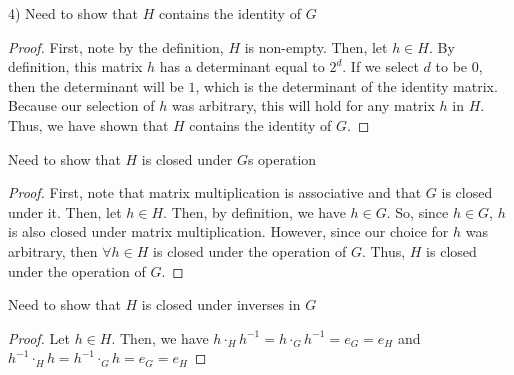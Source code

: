 \documentclass[executivepaper]{article}
\begin{document}
\pagebreak

\vspace*{-40mm}

\begin{flushleft}

4) Need to show that $H$ contains the identity of $G$

\begin{center}

\begin{proof}

First, note by the definition, $H$ is non-empty. Then, let $h \in H$. By definition, this matrix $h$ has a determinant equal to $2^d$. If we select $d$ to be $0$, then the determinant will be $1$, which is the determinant of the identity matrix. Because our selection of $h$ was arbitrary, this will hold for any matrix $h$ in $H$. Thus, we have shown that $H$ contains the identity of $G$.

\end{proof}

\end{center}

Need to show that $H$ is closed under $G$\textsc{}s operation

\begin{center}

\begin{proof}

First, note that matrix multiplication is associative and that $G$ is closed under it. Then, let $h \in H$. Then, by definition, we have $h \in G$. So, since $h \in G$, $h$ is also closed under matrix multiplication. However, since our choice for $h$ was arbitrary, then $\forall h \in H$ is closed under the operation of $G$. Thus, $H$ is closed under the operation of $G$.

\end{proof}

\end{center}

Need to show that $H$ is closed under inverses in $G$

\begin{center}

\begin{proof}

Let $h \in H$. Then, we have $h \cdot_{H} h^{-1}=h \cdot_{G} h^{-1}=e_{G}=e_{H}$ and $h^{-1} \cdot_{H} h =h^{-1} \cdot_{G} h =e_{G}=e_{H}$

\end{proof}

\end{center}

\end{flushleft}
\end{document}
